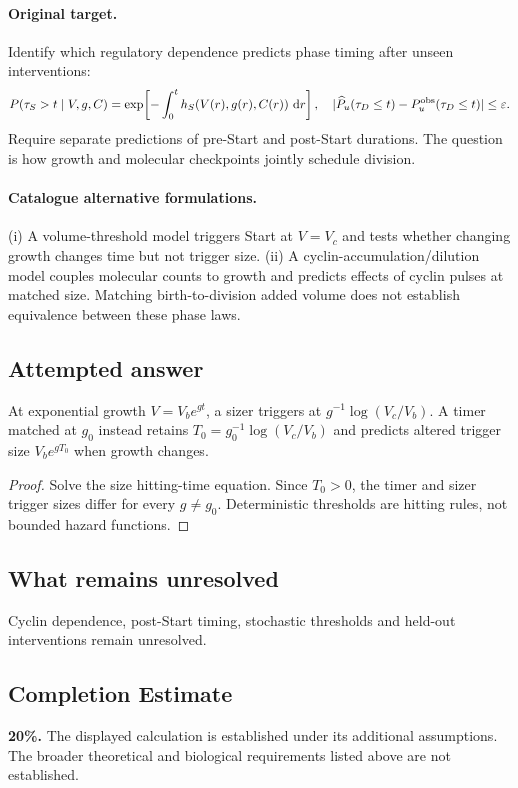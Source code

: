 \documentclass[11pt]{article}
\begin{document}
\paragraph{Original target.}
Identify which regulatory dependence predicts phase timing after unseen interventions:
\[
P(\tau_S>t\mid V,g,C)=\exp\!\left[-\int_0^t h_S(V(r),g(r),C(r))\,\,\mathrm{d} r\right],
\quad |\widehat P_u(\tau_D\leq t)-P_u^{\rm obs}(\tau_D\leq t)|\leq\varepsilon.
\]
Require separate predictions of pre-Start and post-Start durations. The question is how growth and molecular checkpoints jointly schedule division.
\paragraph{Catalogue alternative formulations.}
(i) A volume-threshold model triggers Start at $V=V_c$ and tests whether changing growth changes time but not trigger size. (ii) A cyclin-accumulation/dilution model couples molecular counts to growth and predicts effects of cyclin pulses at matched size. Matching birth-to-division added volume does not establish equivalence between these phase laws.
\subsection{Attempted answer}
\begin{proposition}
At exponential growth $V=V_be^{gt}$, a sizer triggers at $g^{-1}\log(V_c/V_b)$. A timer matched at $g_0$ instead retains $T_0=g_0^{-1}\log(V_c/V_b)$ and predicts altered trigger size $V_be^{gT_0}$ when growth changes.
\end{proposition}
\begin{proof}
Solve the size hitting-time equation. Since $T_0>0$, the timer and sizer trigger sizes differ for every $g\ne g_0$. Deterministic thresholds are hitting rules, not bounded hazard functions.
\end{proof}
\subsection{What remains unresolved}
Cyclin dependence, post-Start timing, stochastic thresholds and held-out interventions remain unresolved.
\subsection{Completion Estimate}
\textbf{20\%.} The displayed calculation is established under its additional assumptions. The broader theoretical and biological requirements listed above are not established.
\end{document}
